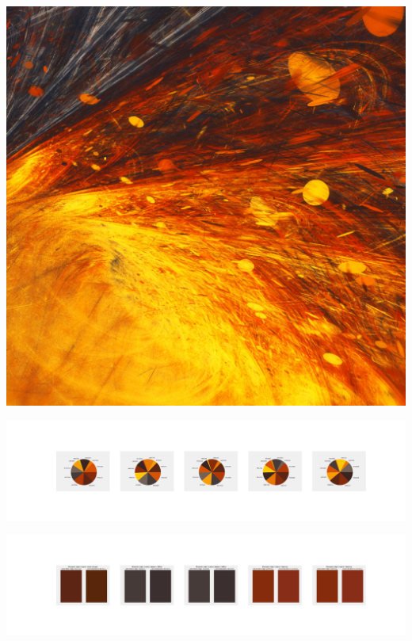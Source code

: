 \documentclass[11pt]{article}
\begin{document}
\begin{landscape}
    \begin{center}
    \includegraphics[width=\textwidth]{./nbimg/file (184).jpg}
    \end{center}

    \begin{center}
    \includegraphics[width=250mm]{./nbimg/pie-94.jpg}
    \end{center}

    \begin{center}
    \includegraphics[width=250mm]{./nbimg/peak-94.jpg}
    \end{center}
    


\end{landscape}
\end{document}
